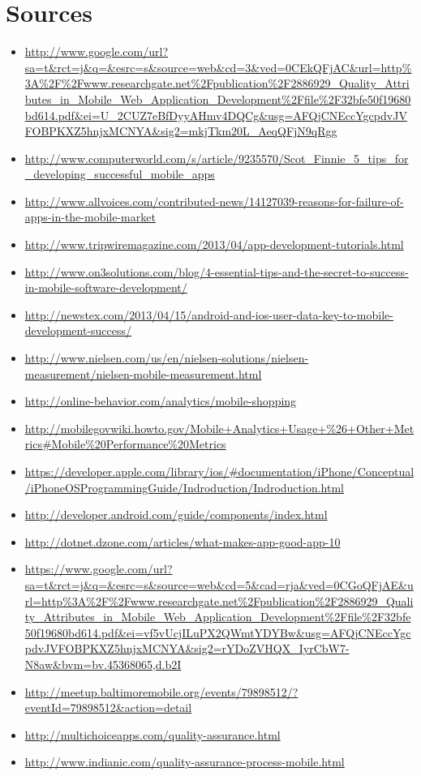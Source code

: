 \documentclass{article}
\begin{document}
	\section*{Sources}
		\begin{itemize}
			\item \url{http://www.google.com/url?sa=t&rct=j&q=&esrc=s&source=web&cd=3&ved=0CEkQFjAC&url=http%3A%2F%2Fwww.researchgate.net%2Fpublication%2F2886929_Quality_Attributes_in_Mobile_Web_Application_Development%2Ffile%2F32bfe50f19680bd614.pdf&ei=U_2CUZ7eBfDyyAHmv4DQCg&usg=AFQjCNEccYgcpdvJVFOBPKXZ5hnjxMCNYA&sig2=mkjTkm20L_AeqQFjN9qRgg}
			\item \url{http://www.computerworld.com/s/article/9235570/Scot_Finnie_5_tips_for_developing_successful_mobile_apps}
			\item \url{http://www.allvoices.com/contributed-news/14127039-reasons-for-failure-of-apps-in-the-mobile-market}
			\item \url{http://www.tripwiremagazine.com/2013/04/app-development-tutorials.html}
			\item \url{http://www.on3solutions.com/blog/4-essential-tips-and-the-secret-to-success-in-mobile-software-development/}
			\item \url{http://newstex.com/2013/04/15/android-and-ios-user-data-key-to-mobile-development-success/}
			\item \url{http://www.nielsen.com/us/en/nielsen-solutions/nielsen-measurement/nielsen-mobile-measurement.html}
			\item \url{http://online-behavior.com/analytics/mobile-shopping}
			\item \url{http://mobilegovwiki.howto.gov/Mobile+Analytics+Usage+%26+Other+Metrics#Mobile%20Performance%20Metrics}
			\item \url{https://developer.apple.com/library/ios/#documentation/iPhone/Conceptual/iPhoneOSProgrammingGuide/Indroduction/Indroduction.html}
			\item \url{http://developer.android.com/guide/components/index.html}
			\item \url{http://dotnet.dzone.com/articles/what-makes-app-good-app-10}
			\item \url{https://www.google.com/url?sa=t&rct=j&q=&esrc=s&source=web&cd=5&cad=rja&ved=0CGoQFjAE&url=http%3A%2F%2Fwww.researchgate.net%2Fpublication%2F2886929_Quality_Attributes_in_Mobile_Web_Application_Development%2Ffile%2F32bfe50f19680bd614.pdf&ei=vf5vUcjILuPX2QWmtYDYBw&usg=AFQjCNEccYgcpdvJVFOBPKXZ5hnjxMCNYA&sig2=rYDoZVHQX_IyrCbW7-N8aw&bvm=bv.45368065,d.b2I}
			\item  \url{http://meetup.baltimoremobile.org/events/79898512/?eventId=79898512&action=detail}
			\item \url{http://multichoiceapps.com/quality-assurance.html}
			\item \url{http://www.indianic.com/quality-assurance-process-mobile.html}
		\end{itemize}
		
\end{document}
